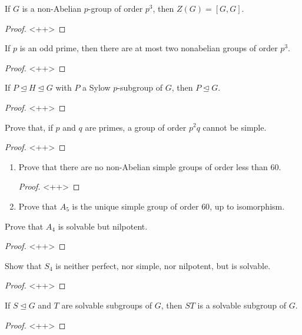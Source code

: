 \documentclass[12pt]{article}
\theoremstyle{definition}
\newenvironment{problem}[2][Problem]{\begin{trivlist}
\item[\hskip \labelsep {\bfseries #1}\hskip \labelsep {\bfseries #2.}]}{\end{trivlist}}
\begin{document}
\begin{problem}{4}
	If $G$ is a non-Abelian $p$-group of order $p^3$, then $Z(G) = [G,G]$.
	\begin{proof}
		<++>
	\end{proof}
\end{problem}
\begin{problem}{5}
	If $p$ is an odd prime, then there are at most two nonabelian groups of order $p^3$.	
	\begin{proof}
		<++>
	\end{proof}
\end{problem}
\begin{problem}{6}
	If $P \trianglelefteq H \trianglelefteq G$ with $P$ a Sylow $p$-subgroup of $G$, then $P \trianglelefteq G$.	\begin{proof}
		<++>
	\end{proof}
\end{problem}
\begin{problem}{7}
	Prove that, if $p$ and $q$ are primes, a group of order $p^2 q$ cannot be simple.
	\begin{proof}
		<++>
	\end{proof}
\end{problem}
\begin{problem}{8}
	\begin{enumerate}[label=(\alph*)]
		\item Prove that there are no non-Abelian simple groups of order less than $60$.
			\begin{proof}
				<++>
			\end{proof}
		\item Prove that $A_5$ is the unique simple group of order $60$, up to isomorphism.
	\end{enumerate}
\end{problem}
\begin{problem}{9}
	Prove that $A_4$ is solvable but nilpotent.
	\begin{proof}
		<++>
	\end{proof}
\end{problem}
\begin{problem}{10}
	Show that $S_4$ is neither perfect, nor simple, nor nilpotent, but is solvable.
	\begin{proof}
	<++>	
	\end{proof}
\end{problem}
\begin{problem}{11}
	If $S \trianglelefteq G$ and $T$ are solvable subgroups of $G$, then $ST$ is a solvable subgroup of $G$.
	\begin{proof}
	<++>	
	\end{proof}
\end{problem}
\end{document}
